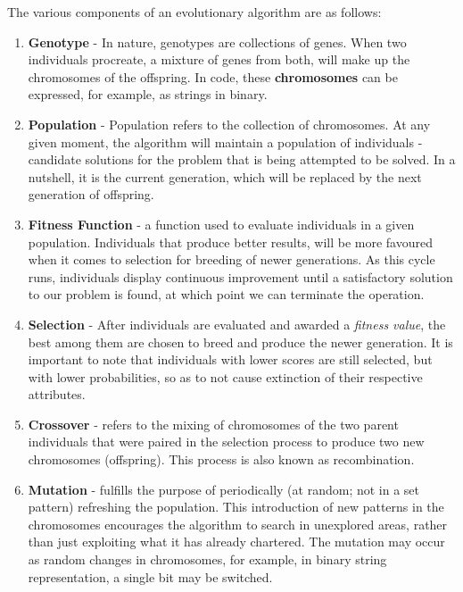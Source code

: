 \documentclass[conference,compsoc]{IEEEtran}
\begin{document}
The various components of an evolutionary algorithm are as follows:
\begin{enumerate}
    \item \textbf{Genotype} - In nature, genotypes are collections of genes. When two individuals procreate, a mixture of genes 
    from both, will make up the chromosomes of the offspring. In code, these \textbf{chromosomes} 
    can be expressed, for example, as strings in binary. 
    \item \textbf{Population} - Population refers to the collection of chromosomes. At any given moment, the 
    algorithm will maintain a population of individuals - candidate solutions for the problem that is being attempted 
    to be solved. In a nutshell, it is the current generation, which will be replaced by the next generation of offspring. 
    \item \textbf{Fitness Function} - a function used to evaluate individuals in a given population. Individuals 
    that produce better results, will be more favoured when it comes to selection for breeding of newer generations. As this cycle runs, 
    individuals display continuous improvement until a satisfactory solution to our problem is found, at which point we can terminate the operation.
    \item \textbf{Selection} - After individuals are evaluated and awarded a \textit{fitness value}, 
    the best among them are chosen to breed and produce the newer generation. It is important to note 
    that individuals with lower scores are still selected, but with lower probabilities, so as to not 
    cause extinction of their respective attributes.
    \item \textbf{Crossover} - refers to the mixing of chromosomes of the two parent individuals 
    that were paired in the selection process to produce two new chromosomes (offspring). This process is also known as recombination.
    \item \textbf{Mutation} - fulfills the purpose of periodically (at random; not in a set pattern) refreshing 
    the population. This introduction of new patterns in the chromosomes encourages the algorithm to search in unexplored areas, rather than 
    just exploiting what it has already chartered. The mutation may occur as random changes in chromosomes, for example, in binary string 
    representation, a single bit may be switched.
\end{enumerate}
\end{document}

